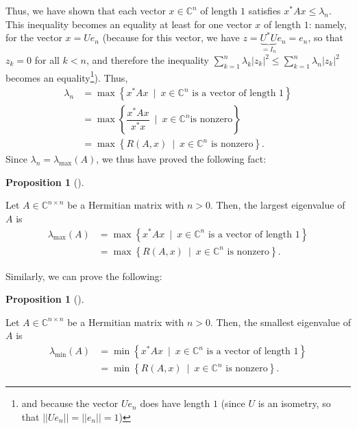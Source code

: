 \documentclass[numbers=enddot,12pt,final,onecolumn,notitlepage]{scrartcl}%
\numberwithin{exer}{subsection}
\theoremstyle{definition}
\newtheorem{prop}[theo]{Proposition}
\newenvironment{proposition}[1][]
{\begin{prop}[#1]\begin{leftbar}}
{\end{leftbar}\end{prop}}
\let\sumnonlimits\sum
\renewcommand{\sum}{\sumnonlimits\limits}
\begin{document}
Thus, we have shown that each vector $x\in\mathbb{C}^{n}$ of length $1$
satisfies $x^{\ast}Ax\leq\lambda_{n}$. This inequality becomes an equality at
least for one vector $x$ of length $1$: namely, for the vector $x=Ue_{n}$
(because for this vector, we have $z=\underbrace{U^{\ast}U}_{=I_{n}}%
e_{n}=e_{n}$, so that $z_{k}=0$ for all $k<n$, and therefore the inequality
$\sum_{k=1}^{n}\lambda_{k}\left\vert z_{k}\right\vert ^{2}\leq\sum_{k=1}%
^{n}\lambda_{n}\left\vert z_{k}\right\vert ^{2}$ becomes an
equality\footnote{and because the vector $Ue_{n}$ does have length $1$ (since
$U$ is an isometry, so that $\left\vert \left\vert Ue_{n}\right\vert
\right\vert =\left\vert \left\vert e_{n}\right\vert \right\vert =1$)}). Thus,%
\begin{align*}
\lambda_{n}  &  =\max\left\{  x^{\ast}Ax\ \mid\ x\in\mathbb{C}^{n}\text{ is a
vector of length }1\right\} \\
&  =\max\left\{  \dfrac{x^{\ast}Ax}{x^{\ast}x}\ \mid\ x\in\mathbb{C}^{n}\text{
is nonzero}\right\} \\
&  =\max\left\{  R\left(  A,x\right)  \ \mid\ x\in\mathbb{C}^{n}\text{ is
nonzero}\right\}  .
\end{align*}
Since $\lambda_{n}=\lambda_{\max}\left(  A\right)  $, we thus have proved the
following fact:

\begin{proposition}
\label{prop.herm.cour-fish-max}Let $A\in\mathbb{C}^{n\times n}$ be a Hermitian
matrix with $n>0$. Then, the largest eigenvalue of $A$ is%
\begin{align*}
\lambda_{\max}\left(  A\right)   &  =\max\left\{  x^{\ast}Ax\ \mid
\ x\in\mathbb{C}^{n}\text{ is a vector of length }1\right\} \\
&  =\max\left\{  R\left(  A,x\right)  \ \mid\ x\in\mathbb{C}^{n}\text{ is
nonzero}\right\}  .
\end{align*}

\end{proposition}

Similarly, we can prove the following:

\begin{proposition}
\label{prop.herm.cour-fish-min}Let $A\in\mathbb{C}^{n\times n}$ be a Hermitian
matrix with $n>0$. Then, the smallest eigenvalue of $A$ is%
\begin{align*}
\lambda_{\min}\left(  A\right)   &  =\min\left\{  x^{\ast}Ax\ \mid
\ x\in\mathbb{C}^{n}\text{ is a vector of length }1\right\} \\
&  =\min\left\{  R\left(  A,x\right)  \ \mid\ x\in\mathbb{C}^{n}\text{ is
nonzero}\right\}  .
\end{align*}

\end{proposition}
\end{document}
